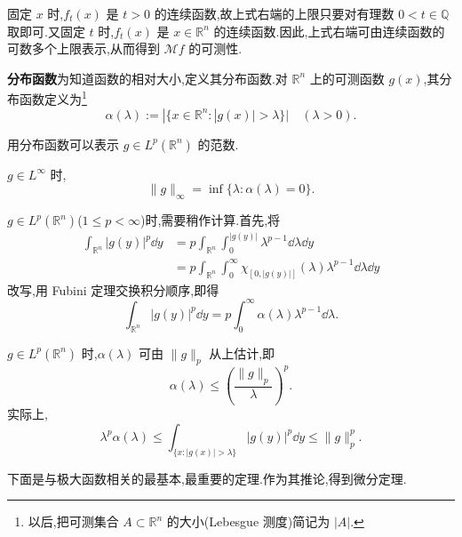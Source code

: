 固定 $x$ 时,$f_{t}(x)$ 是 $t > 0$ 的连续函数,故上式右端的上限只要对有理数 $0 < t \in \mathbb{Q}$ 取即可.又固定 $t$ 时,$f_{t}(x)$ 是 $x \in \mathbb{R}^{n}$ 的连续函数.因此,上式右端可由连续函数的可数多个上限表示,从而得到 $\mathcal{M}f$ 的可测性.

\noindent\textbf{分布函数}\quad 为知道函数的相对大小,定义其分布函数.对 $\mathbb{R}^{n}$ 上的可测函数 $g(x)$,其分布函数定义为\footnote{以后,把可测集合 $A \subset \mathbb{R}^{n}$ 的大小(Lebesgue 测度)简记为 $|A|$.}
\begin{equation}
\alpha(\lambda) := |\{x \in \mathbb{R}^{n}: |g(x)| > \lambda\}| \quad (\lambda > 0).\tag{4.1.4}
\label{eq:4.1.4}\end{equation}

用分布函数可以表示 $g \in L^{p}(\mathbb{R}^{n})$ 的范数.

$g \in L^{\infty}$ 时,
\begin{equation*}
\|g\|_{\infty} = \inf\{\lambda : \alpha(\lambda) = 0\}.
\end{equation*}

$g \in L^{p}(\mathbb{R}^{n})$($1 \leq p < \infty$)时,需要稍作计算.首先,将
\begin{align*}
\int_{\mathbb{R}^{n}}|g(y)|^{p}\dd y & = p\int_{\mathbb{R}^{n}}\int_{0}^{|g(y)|}\lambda^{p-1}\dd\lambda\dd y \\
& = p\int_{\mathbb{R}^{n}}\int_{0}^{\infty}\chi_{[0,|g(y)|]}(\lambda)\lambda^{p-1}\dd\lambda\dd y
\end{align*}
改写,用 Fubini 定理交换积分顺序,即得
\begin{equation}
\int_{\mathbb{R}^{n}}|g(y)|^{p}\dd y = p\int_{0}^{\infty}\alpha(\lambda)\lambda^{p-1}\dd\lambda.\tag{4.1.5}
\label{eq:4.1.5}\end{equation}

$g \in L^{p}(\mathbb{R}^{n})$ 时,$\alpha(\lambda)$ 可由 $\|g\|_{p}$ 从上估计,即
\begin{equation}
\alpha(\lambda) \leq \left(\frac{\|g\|_{p}}{\lambda}\right)^{p}.\tag{4.1.6}
\label{eq:4.1.6}\end{equation}
实际上,
\begin{equation*}
\lambda^{p}\alpha(\lambda) \leq \int_{\{x: |g(x)| > \lambda\}}|g(y)|^{p}\dd y \leq \|g\|_{p}^{p}.
\end{equation*}

下面是与极大函数相关的最基本,最重要的定理.作为其推论,得到微分定理.

